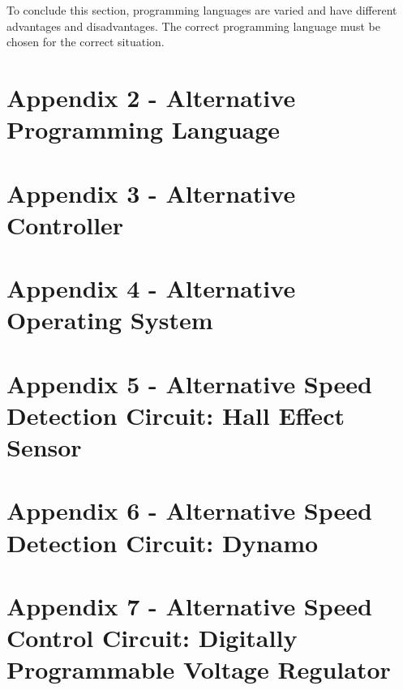 \documentclass{report}
\begin{document}
	To conclude this section,  programming languages are varied and have different advantages and disadvantages. The correct programming language must be chosen for the correct situation.\newline \newline  \noindent
\section{Appendix 2 -  Alternative Programming Language}
\section{Appendix 3 -  Alternative Controller}
\section{Appendix 4 -  Alternative Operating System}
\section{Appendix 5 -  Alternative Speed Detection Circuit: \newline Hall Effect Sensor}
\section{Appendix 6 -  Alternative Speed Detection Circuit: \newline Dynamo}
\section{Appendix 7 -  Alternative Speed Control Circuit: \newline Digitally Programmable Voltage Regulator}
\end{document}
